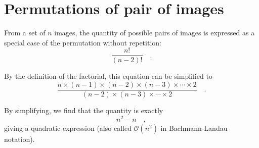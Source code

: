\documentclass{report}
\begin{document}
\section{Permutations of pair of images}
\label{anx:permutations}

From a set of $n$ images, the quantity of possible pairs of images is expressed as a special case of the permutation without repetition:
\begin{equation}
\frac{n!}{\left( n - 2 \right)!} \quad.
\end{equation}

By the definition of the factorial, this equation can be simplified to
\begin{equation}
\frac{n \times (n-1) \times (n-2) \times (n-3) \times \cdots \times 2}{(n-2) \times (n-3) \times \cdots \times 2} \quad.
\end{equation}

By simplifying, we find that the quantity is exactly
\begin{equation}
n^2 - n\quad,
\end{equation}
giving a quadratic expression (also called $\mathcal{O}(n^2)$ in Bachmann-Landau notation).

{\small


}
\end{document}
